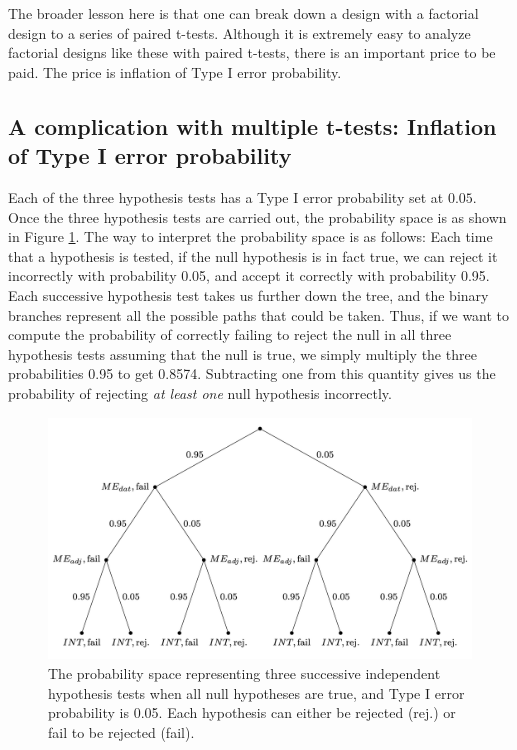 \documentclass[
  12pt,
]{krantz}
\theoremstyle{definition}
\theoremstyle{definition}
\theoremstyle{definition}
\theoremstyle{definition}
\theoremstyle{remark}
\begin{document}
The broader lesson here is that one can break down a design with a factorial design to a series of paired t-tests. Although it is extremely easy to analyze factorial designs like these with paired t-tests, there is an important price to be paid. The price is inflation of Type I error probability.

\hypertarget{a-complication-with-multiple-t-tests-inflation-of-type-i-error-probability}{%
\subsection{A complication with multiple t-tests: Inflation of Type I error probability}\label{a-complication-with-multiple-t-tests-inflation-of-type-i-error-probability}}

Each of the three hypothesis tests has a Type I error probability set at \(0.05\). Once the three hypothesis tests are carried out, the probability space is as shown in Figure \ref{fig:probtree}. The way to interpret the probability space is as follows: Each time that a hypothesis is tested, if the null hypothesis is in fact true, we can reject it incorrectly with probability 0.05, and accept it correctly with probability 0.95. Each successive hypothesis test takes us further down the tree, and the binary branches represent all the possible paths that could be taken. Thus, if we want to compute the probability of correctly failing to reject the null in all three hypothesis tests assuming that the null is true, we simply multiply the three probabilities 0.95 to get 0.8574. Subtracting one from this quantity gives us the probability of rejecting \emph{at least one} null hypothesis incorrectly.

\begin{figure}

{\centering \includegraphics[width=0.8\linewidth]{figures/probtree} 

}

\caption{The probability space representing three successive independent hypothesis tests when all null hypotheses are true, and Type I error probability is 0.05. Each hypothesis can either be rejected (rej.) or fail to be rejected (fail).}\label{fig:probtree}
\end{figure}
\end{document}

